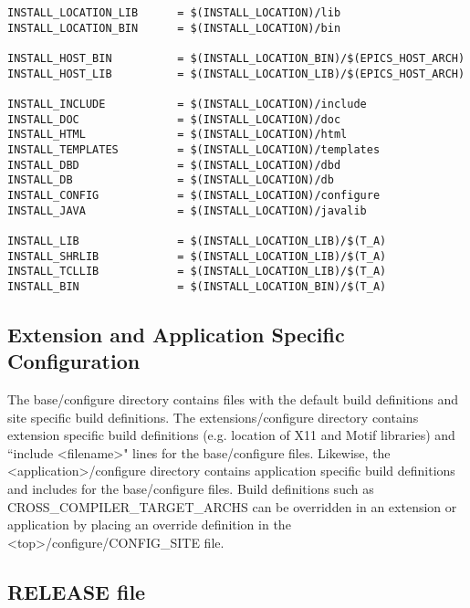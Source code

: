 \begin{verbatim}
INSTALL_LOCATION_LIB      = $(INSTALL_LOCATION)/lib
INSTALL_LOCATION_BIN      = $(INSTALL_LOCATION)/bin

INSTALL_HOST_BIN          = $(INSTALL_LOCATION_BIN)/$(EPICS_HOST_ARCH)
INSTALL_HOST_LIB          = $(INSTALL_LOCATION_LIB)/$(EPICS_HOST_ARCH)

INSTALL_INCLUDE           = $(INSTALL_LOCATION)/include
INSTALL_DOC               = $(INSTALL_LOCATION)/doc
INSTALL_HTML              = $(INSTALL_LOCATION)/html
INSTALL_TEMPLATES         = $(INSTALL_LOCATION)/templates
INSTALL_DBD               = $(INSTALL_LOCATION)/dbd
INSTALL_DB                = $(INSTALL_LOCATION)/db
INSTALL_CONFIG            = $(INSTALL_LOCATION)/configure
INSTALL_JAVA              = $(INSTALL_LOCATION)/javalib

INSTALL_LIB               = $(INSTALL_LOCATION_LIB)/$(T_A)
INSTALL_SHRLIB            = $(INSTALL_LOCATION_LIB)/$(T_A)
INSTALL_TCLLIB            = $(INSTALL_LOCATION_LIB)/$(T_A)
INSTALL_BIN               = $(INSTALL_LOCATION_BIN)/$(T_A)
\end{verbatim}

\subsection{Extension and Application Specific Configuration}

The base/configure directory contains files with the default build definitions and site specific build definitions. The 
extensions/configure directory contains extension specific build definitions (e.g. location of X11 and Motif libraries) and 
``include \textless{}filename\textgreater{}" lines for the base/configure files. Likewise, the \textless{}application\textgreater{}/configure directory contains 
application specific build definitions and includes for the base/configure files. Build definitions such as \\ 
CROSS\_COMPILER\_TARGET\_ARCHS can be overridden in an extension or application by placing an override 
definition in the \textless{}top\textgreater{}/configure/CONFIG\_SITE file.

\subsection{RELEASE file}

